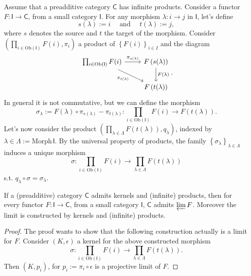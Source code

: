 \begin{rem}
	Assume that a preadditive category $\mathsf{C}$ has infinite products.
	Consider a functor $F: \mathsf{I} \to \mathsf{C}$, from a small category $\mathsf{I}$.
	For any morphism $\lambda: i \to j$ in $\mathsf{I}$, let's define
	\begin{equation}
		s(\lambda) := i \quad \text{ and } \quad t(\lambda) := j
	,\end{equation} 
	where $s$ denotes the source and $t$ the target of the morphism.
	Consider $\left(\prod_{i \in \mathrm{Ob} \left(\mathsf{I}\right)} F(i),  \pi_i \right)$ a product of $\left\{ F(i) \right\}_{i \in I}$ and the diagram
	\begin{equation}
	\begin{tikzcd}
		\prod_{i \in \mathrm{Ob} \left(\mathsf{I}\right)} F(i) \arrow[r, "\pi_{s(\lambda)}", rightarrow] 
		\arrow[rd, "\pi_{t(\lambda)}"', rightarrow] &
		F \left( s(\lambda) \right) \arrow[d, "F(\lambda)", rightarrow] \\
		& F \left( t(\lambda) \right)
	\end{tikzcd}
	.\end{equation} 
	In general it is not commutative, but we can define the morphism
	\begin{equation}
		\sigma_\lambda := F(\lambda) \circ \pi_{s(\lambda)} - \pi_{t(\lambda)}: \prod_{i \in \mathrm{Ob} \left(\mathsf{I}\right)} F(i) \to F \left( t(\lambda) \right)
	.\end{equation} 
	Let's now consider the product $\left(\prod_{\lambda \in \Lambda} F \left( t(\lambda) \right), q_\lambda\right)$, indexed by $\lambda \in \Lambda := \mathrm{Morph}\, \mathsf{I}$.
	By the universal property of products, the family $\left\{ \sigma_\lambda \right\}_{\lambda \in \Lambda}$ induces a unique morphism
	 \begin{equation}
		 \sigma: \prod_{i \in \mathrm{Ob} \left(\mathsf{I}\right)} F(i) \to \prod_{\lambda \in \Lambda} F \left( t(\lambda) \right)
	\end{equation} 
	s.t. $q_\lambda \circ\sigma = \sigma_\lambda$.
\end{rem}

\begin{prop}\label{prop:LimConstr}
	If a (preadditive) category $\mathsf{C}$ admits kernels and (infinite) products,
	then for every functor $F: \mathsf{I} \to \mathsf{C}$, from a small category $\mathsf{I}$, 
	$\mathsf{C}$ admits $\varprojlim F$.
	Moreover the limit is constructed by kernels and (infinite) products.
\end{prop} 
\begin{proof}
	The proof wants to show that the following construction actually is a limit for $F$.
	Consider $\left(K, \epsilon\right)$ a kernel for the above constructed morphism
	\begin{equation}
		\sigma: \prod_{i \in \mathrm{Ob} \left(\mathsf{I}\right)} F(i) \to \prod_{\lambda \in \Lambda} F \left( t(\lambda) \right)
	.\end{equation} 
	Then $\left(K, p_i\right)$, for $p_i := \pi_i \circ\epsilon$ is a projective limit of $F$.
\end{proof}

